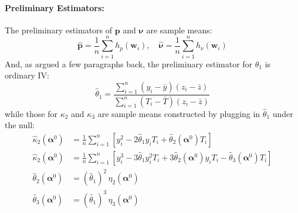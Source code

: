 \documentclass[12pt]{article}
\begin{document}
\paragraph{Preliminary Estimators:} The preliminary estimators of $\mathbf{p}$ and $\boldsymbol{\nu}$ are sample means:
\[
  \widehat{\mathbf{p}} = \frac{1}{n}\sum_{i=1}^n h_p(\mathbf{w}_i), \quad
  \widehat{\boldsymbol{\nu}} = \frac{1}{n}\sum_{i=1}^n h_\nu(\mathbf{w}_i) 
\]
And, as argued a few paragraphs back, the preliminary estimator for $\theta_1$ is ordinary IV: 
\[
  \widehat{\theta}_1 = \frac{\sum_{i=1}^n (y_i - \bar{y})(z_i - \bar{z})}{\sum_{i=1}^n (T_i - \bar{T})(z_i - \bar{z})}
\]
while those for $\kappa_2$ and $\kappa_3$ are sample means constructed by plugging in $\widehat{\theta}_1$ under the null: 
\begin{align*}
  \widehat{\kappa}_2(\boldsymbol{\alpha}^0) &= \frac{1}{n} \sum_{i=1}^n \left[y_i^2 - 2\widehat{\theta}_1 y_i T_i + \widehat{\theta}_2(\boldsymbol{\alpha}^0) T_i \right]\\
  \widehat{\kappa}_2(\boldsymbol{\alpha}^0) &= \frac{1}{n} \sum_{i=1}^n 
  \left[y_i^3 - 3\widehat{\theta}_1  y_i^2 T_i +  3\widehat{\theta}_2(\boldsymbol{\alpha}^0) y_iT_i -  \widehat{\theta}_3(\boldsymbol{\alpha}^0)T_i\right]\\
  \widehat{\theta}_2(\boldsymbol{\alpha}^0) &= (\widehat{\theta}_1)^2 \, \eta_2(\boldsymbol{\alpha}^0)\\
  \widehat{\theta}_3(\boldsymbol{\alpha}^0) &= (\widehat{\theta}_1)^3\, \eta_3(\boldsymbol{\alpha}^0)
\end{align*}
\end{document}
